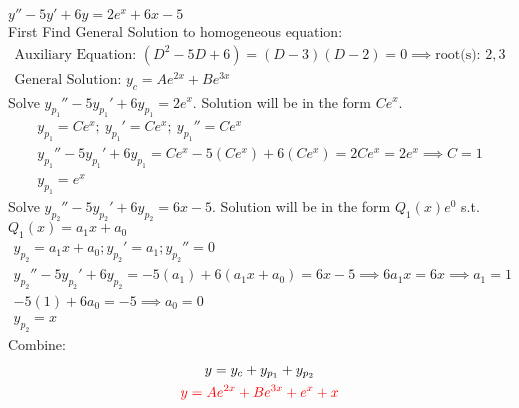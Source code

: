 \item [34.] $y'' -5y'+ 6y = 2e^x+6x-5$\\[2mm]
First Find General Solution to homogeneous equation:
\begin{gather*}
    \text{Auxiliary Equation: } (D^2-5D+6)=(D-3)(D-2)=0
    \implies \text{root(s): } 2,3\\
    \text{General Solution: } y_c=Ae^{2x}+Be^{3x}
\end{gather*}
Solve $y_{p_1}''-5y_{p_1}'+6y_{p_1}=2e^x$. Solution will be in the form $Ce^x$.
\begin{gather*}
    y_{p_1} = Ce^x;\:
    y_{p_1}' = Ce^x;\:
    y_{p_1}'' = Ce^x\\
    y_{p_1}''-5y_{p_1}'+6y_{p_1} = Ce^x-5(Ce^x)+6(Ce^x)=2Ce^x=2e^x \implies C = 1\\
    y_{p_1}=e^x
\end{gather*}
Solve $y_{p_2}''-5y_{p_2}'+6y_{p_2}=6x-5$. Solution will be in the form $Q_1(x)e^0$ s.t. $Q_1(x)=a_1x+a_0$
\begin{gather*}
    y_{p_2}=a_1x+a_0; y_{p_2}'=a_1; y_{p_2}''=0\\
    y_{p_2}''-5y_{p_2}'+6y_{p_2} =-5(a_1)+6(a_1x+a_0)=6x-5
    \implies 6a_1x = 6x \implies a_1 = 1\\
    -5(1)+6a_0 = -5 \implies a_0 = 0\\
    y_{p_2}=x
\end{gather*}
Combine:
\begin{gather*}
    y = y_c+y_{p_1}+y_{p_2}\\
    \textcolor{red}{y = 
    Ae^{2x}+Be^{3x}
    +e^x
    +x}
\end{gather*}
